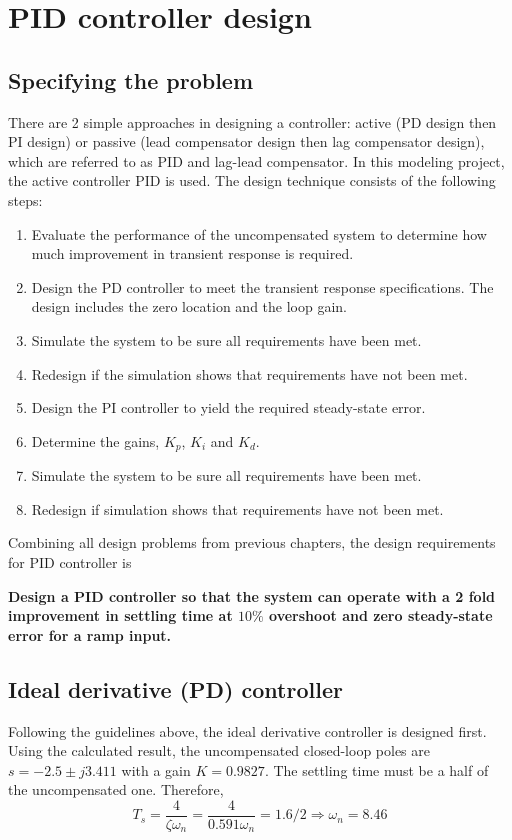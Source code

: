 \chapter{PID controller design}

\section{Specifying the problem}
There are 2 simple approaches in designing a controller: active (PD design then PI design) or passive (lead compensator design then lag compensator design), which are referred to as PID and lag-lead compensator. In this modeling project, the active controller PID is used. The design technique consists of the following steps:
\begin{enumerate}
	\item Evaluate the performance of the uncompensated system to determine how much improvement in transient response is required.
	\item Design the PD controller to meet the transient response specifications. The design includes the zero location and the loop gain.
	\item Simulate the system to be sure all requirements have been met.
	\item Redesign if the simulation shows that requirements have not been met.
	\item Design the PI controller to yield the required steady-state error.
	\item Determine the gains, $ K_p $, $ K_i $ and $ K_d $.
	\item Simulate the system to be sure all requirements have been met.
	\item Redesign if simulation shows that requirements have not been met.
\end{enumerate}

Combining all design problems from previous chapters, the design requirements for PID controller is

\textbf{Design a PID controller so that the system can operate with a 2 fold improvement in settling time at $ 10\% $ overshoot and zero steady-state error for a ramp input.}

\section{Ideal derivative (PD) controller}
Following the guidelines above, the ideal derivative controller is designed first. Using the calculated result, the uncompensated closed-loop poles are $ s = -2.5\pm j3.411 $ with a gain $ K=0.9827 $. The settling time must be a half of the uncompensated one. Therefore,
\begin{equation}
	T_s = \dfrac{4}{\zeta \omega_n} = \dfrac{4}{0.591 \omega_n} = 1.6/2 \Rightarrow \omega_n = 8.46
\end{equation}

